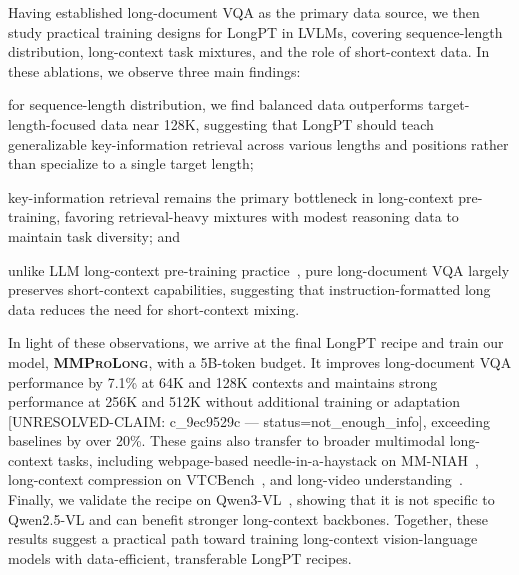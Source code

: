 \documentclass{llmxive}
\providecommand{\modelname}{\textsc{\textbf{MMProLong}}\xspace}
\begin{document}
Having established long-document VQA as the primary data source, we then study practical training designs for LongPT in LVLMs, covering sequence-length distribution, long-context task mixtures, and the role of short-context data.
In these ablations, we observe three main findings:
\begin{inparaenum}[i)]
\item for sequence-length distribution, we find balanced data outperforms target-length-focused data near 128K, suggesting that LongPT should teach generalizable key-information retrieval across various lengths and positions rather than specialize to a single target length;
\item key-information retrieval remains the primary bottleneck in long-context pre-training, favoring retrieval-heavy mixtures with modest reasoning data to maintain task diversity; and
\item unlike LLM long-context pre-training practice~\citep{gao2025prolong}, pure long-document VQA largely preserves short-context capabilities, suggesting that instruction-formatted long data reduces the need for short-context mixing.
\end{inparaenum}

In light of these observations, we arrive at the final LongPT recipe and train our model, \modelname, with a 5B-token budget.
It improves long-document VQA performance by 7.1\% at 64K and 128K contexts and maintains strong performance at 256K and 512K without additional training or adaptation [UNRESOLVED-CLAIM: c_9ec9529c — status=not_enough_info], exceeding baselines by over 20\%.
These gains also transfer to broader multimodal long-context tasks, including webpage-based needle-in-a-haystack on MM-NIAH~\citep{wang2024needle}, long-context compression on VTCBench~\citep{zhao2025vtcbench}, and long-video understanding~\citep{fu2025video,zhou2025mlvu,wu2024longvideobench}.
Finally, we validate the recipe on Qwen3-VL~\citep{bai2025qwen3}, showing that it is not specific to Qwen2.5-VL and can benefit stronger long-context backbones.
Together, these results suggest a practical path toward training long-context vision-language models with data-efficient, transferable LongPT recipes.
\end{document}
